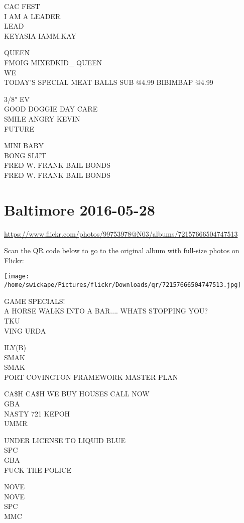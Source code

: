 \documentclass[10pt,letterpaper]{article}
\begin{document}
CAC FEST\\
I AM A LEADER\\
LEAD\\
KEYASIA IAMM.KAY

QUEEN\\
FMOIG MIXEDKID\_ QUEEN\\
WE\\
TODAY'S SPECIAL MEAT BALLS SUB @4.99 BIBIMBAP @4.99

3/8" EV\\
GOOD DOGGIE DAY CARE\\
SMILE ANGRY KEVIN\\
FUTURE

MINI BABY\\
BONG SLUT\\
FRED W. FRANK BAIL BONDS\\
FRED W. FRANK BAIL BONDS


\section*{Baltimore 2016-05-28}

\url{https://www.flickr.com/photos/99753978@N03/albums/72157666504747513}

Scan the QR code below to go to the original album with full-size photos on Flickr:

\texttt{[image: /home/swickape/Pictures/flickr/Downloads/qr/72157666504747513.jpg]}


GAME SPECIALS!\\
A HORSE WALKS INTO A BAR.... WHATS STOPPING YOU?\\
TKU\\
VING URDA

ILY(B)\\
SMAK\\
SMAK\\
PORT COVINGTON FRAMEWORK MASTER PLAN

CA\$H CA\$H WE BUY HOUSES CALL NOW\\
GBA\\
NASTY 721 KEPOH\\
UMMR

UNDER LICENSE TO LIQUID BLUE\\
SPC\\
GBA\\
FUCK THE POLICE

NOVE\\
NOVE\\
SPC\\
MMC
\end{document}
